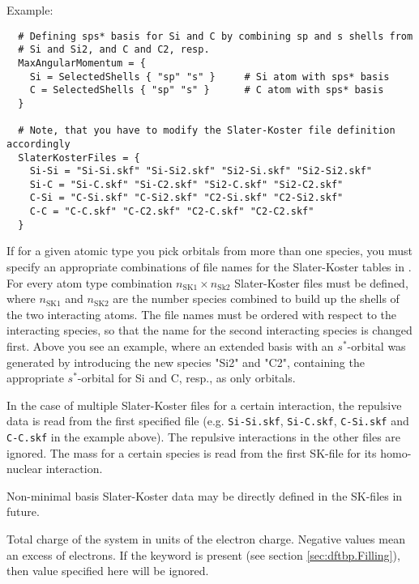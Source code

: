 \begin{description}
  Example:
\begin{verbatim}
  # Defining sps* basis for Si and C by combining sp and s shells from
  # Si and Si2, and C and C2, resp.
  MaxAngularMomentum = {
    Si = SelectedShells { "sp" "s" }     # Si atom with sps* basis
    C = SelectedShells { "sp" "s" }      # C atom with sps* basis
  }

  # Note, that you have to modify the Slater-Koster file definition accordingly
  SlaterKosterFiles = {
    Si-Si = "Si-Si.skf" "Si-Si2.skf" "Si2-Si.skf" "Si2-Si2.skf"
    Si-C = "Si-C.skf" "Si-C2.skf" "Si2-C.skf" "Si2-C2.skf"
    C-Si = "C-Si.skf" "C-Si2.skf" "C2-Si.skf" "C2-Si2.skf"
    C-C = "C-C.skf" "C-C2.skf" "C2-C.skf" "C2-C2.skf"
  }
\end{verbatim}

  If for a given atomic type you pick orbitals from more than one species, you
  must specify an appropriate combinations of file names for the Slater-Koster
  tables in . For every
  atom type combination $n_{\text{SK1}}\times n_{\text{Sk2}}$ Slater-Koster
  files must be defined, where $n_{\text{SK1}}$ and $n_{\text{SK2}}$ are the
  number species combined to build up the shells of the two interacting
  atoms. The file names must be ordered with respect to the interacting species,
  so that the name for the second interacting species is changed first. Above
  you see an example, where an extended basis with an $s^*$-orbital was
  generated by introducing the new species "Si2" and "C2", containing the
  appropriate $s^*$-orbital for Si and C, resp., as only orbitals.

  In the case of multiple Slater-Koster files for a certain
  interaction, the repulsive data is read from the first specified
  file (e.g. \verb|Si-Si.skf|, \verb|Si-C.skf|, \verb|C-Si.skf| and
  \verb|C-C.skf| in the example above). The repulsive interactions in
  the other files are ignored. The mass for a certain species is read
  from the first SK-file for its homo-nuclear interaction.

  Non-minimal basis Slater-Koster data may be directly defined in the
  SK-files in future.

\item[\is{Charge}] Total charge of the system in units of the electron
  charge. Negative values mean an excess of electrons. If the keyword
   is present (see section \ref{sec:dftbp.Filling}), then value
  specified here will be ignored.


\end{description}
